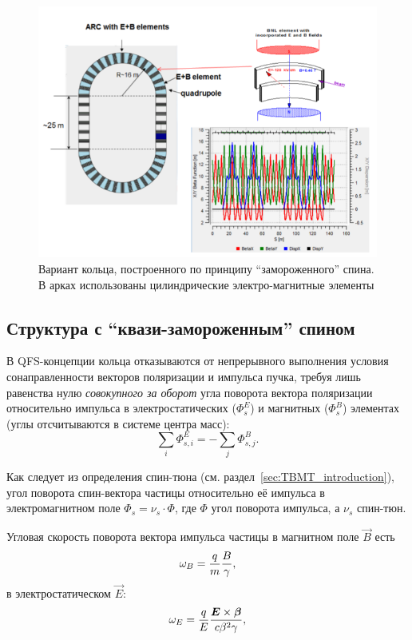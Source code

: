 \begin{figure}[H]
	\centering
	\includegraphics[width=\linewidth]{images/chapter2/BNL_lattice}
	\caption{Вариант кольца, построенного по принципу ``замороженного'' спина. В арках использованы цилиндрические электро-магнитные элементы 
	\label{fig:BNL_lattice}}
\end{figure}

\subsection{Структура с ``квази-замороженным'' спином} \label{chpt2:concept:QFS}
В QFS-концепции кольца отказываются от непрерывного выполнения условия сонаправленности векторов поляризации и импульса пучка, требуя лишь равенства нулю \emph{совокупного за оборот} угла поворота вектора поляризации относительно импульса в электростатических ($\Phi_s^E$) и магнитных ($\Phi_s^B$) элементах (углы отсчитываются в системе центра масс):~\cite{Senichev:Lattices}
\begin{equation*}
	\sum_i \Phi_{s,i}^E = -\sum_j \Phi_{s,j}^B.
\end{equation*}

Как следует из определения спин-тюна (см. раздел~\ref{sec:TBMT_introduction}), угол поворота спин-вектора частицы относительно её импульса в электромагнитном поле ${\Phi_s = \nu_s \cdot \Phi}$, где $\Phi$ угол поворота импульса, а $\nu_s$ спин-тюн.

Угловая скорость поворота вектора импульса частицы в магнитном поле $\vec B$ есть 
\[
\omega_B = \frac qm \frac B \gamma,
\]
в электростатическом $\vec E$:
\[
\omega_E = \frac qE \frac{\boldsymbol E\times \boldsymbol\beta}{c\beta^2\gamma},
\]

